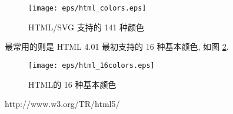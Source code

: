 \begin{figure}[h]
	\centering
	\texttt{[image: eps/html\_colors.eps]}
	\caption{HTML/SVG 支持的 141 种颜色}
	\label{fig:1.4.2}
\end{figure}

最常用的则是 HTML
  4.01 
 最初支持的 16 种基本颜色, 如图 \ref{fig:1.4.3}. 

\begin{figure}
	\centering
	\texttt{[image: eps/html\_16colors.eps]}
	\caption{HTML的 16 种基本颜色}
	\label{fig:1.4.3}
\end{figure}

http://www.w3.org/TR/html5/
